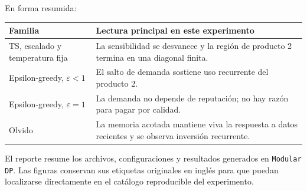 \documentclass[11pt]{article}
\begin{document}
En forma resumida:
\begin{center}
\begin{tabular}{p{4.3cm}p{8.3cm}}
\toprule
Familia & Lectura principal en este experimento \\
\midrule
TS, escalado y temperatura fija & La sensibilidad se desvanece y la región de
producto 2 termina en una diagonal finita. \\
Epsilon-greedy, $\varepsilon<1$ & El salto de demanda sostiene uso recurrente
del producto 2. \\
Epsilon-greedy, $\varepsilon=1$ & La demanda no depende de reputación; no hay
razón para pagar por calidad. \\
Olvido & La memoria acotada mantiene viva la respuesta a datos recientes y se
observa inversión recurrente. \\
\bottomrule
\end{tabular}
\end{center}

\vfill
{\small\color{gris}
El reporte resume los archivos, configuraciones y resultados generados en
\texttt{Modular DP}. Las figuras conservan sus etiquetas originales en inglés
para que puedan localizarse directamente en el catálogo reproducible del
experimento.}
\end{document}
